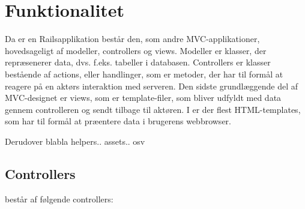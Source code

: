 \section{Funktionalitet}
\label{sec:funktionalitet}

Da {\Foodl} er en Railsapplikation består den, som andre MVC-applikationer, hovedsageligt af modeller, controllers og views. Modeller er klasser, der repræsenerer data, dvs. f.eks. tabeller i databasen. Controllers er klasser bestående af actions, eller handlinger, som er metoder, der har til formål at reagere på en aktørs interaktion med serveren. Den sidste grundlæggende del af MVC-designet er views, som er template-filer, som bliver udfyldt med data gennem controlleren og sendt tilbage til aktøren. I {\Foodl} er der flest HTML-templates, som har til formål at præentere data i brugerens webbrowser.

Derudover blabla helpers.. assets.. osv\todo{}

\subsection{Controllers}
\label{sec:controllers}

{\Foodl} består af følgende controllers:

